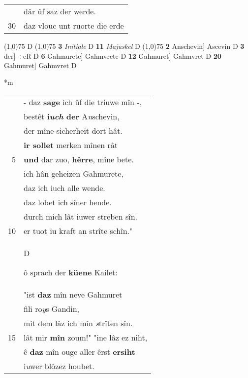 \documentclass[8pt,a4paper,notitlepage]{article}
\begin{document}
\begin{table}[ht]
\begin{minipage}[t]{0.5\linewidth}
\begin{tabular}{rl}
 & dâr ûf saz der werde.\\ 
30 & daz vlouc unt ruorte die erde\\ 
\end{tabular}
\scriptsize
\line(1,0){75} \newline
D \newline
\line(1,0){75} \newline
\textbf{3} \textit{Initiale} D  \textbf{11} \textit{Majuskel} D  \newline
\line(1,0){75} \newline
\textbf{2} Anschevin] Ascevin D \textbf{3} der] ÷eR D \textbf{6} Gahmurete] Gahmvrete D \textbf{12} Gahmuret] Gahmvret D \textbf{20} Gahmuret] Gahmvret D \newline
\end{minipage}
\hspace{0.5cm}
\begin{minipage}[t]{0.5\linewidth}
\small
\begin{center}*m
\end{center}
\begin{tabular}{rl}
 & - daz \textbf{sage} ich ûf die triuwe mîn -,\\ 
 & bestêt \textbf{i\textit{uch} der} A\textit{n}schevin,\\ 
 & der mîne sicherheit dort hât.\\ 
 & \textbf{ir sollet} merken mînen rât\\ 
5 & \textbf{und} dar zuo, \textbf{hêrre}, mîne bete.\\ 
 & ich hân geheizen Gahmurete,\\ 
 & daz ich iuch alle wende.\\ 
 & daz lobet ich sîner hende.\\ 
 & durch mich lât iuwer streben sîn.\\ 
10 & er tuot iu kraft an strîte schîn."\\ 
 & \begin{large}D\end{large}ô sprach der \textbf{küene} Kailet:\\ 
 & "ist \textbf{daz} mîn neve Gahmuret\\ 
 & fili ro\textit{y}s Gandin,\\ 
 & mit dem lâz ich mîn \textit{s}trîten sîn.\\ 
15 & lât mir \textbf{mîn} zoum!" "ine lâz ez niht,\\ 
 & ê \textbf{daz} mîn ouge aller êrst \textbf{ersiht}\\ 
 & i\textit{u}wer blôzez houbet.\\ 

\end{tabular}
\end{minipage}
\end{table}
\end{document}
